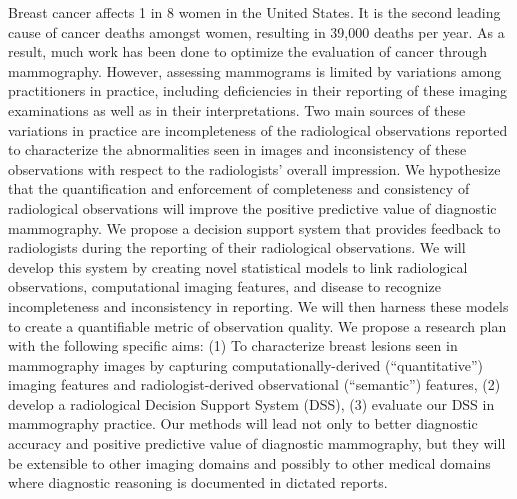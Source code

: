 Breast cancer affects 1 in 8 women in the United States. It is the second leading cause of cancer deaths amongst women, resulting in 39,000 deaths per year. As a result, much work has been done to optimize the evaluation of cancer through mammography. However, assessing mammograms is limited by variations among practitioners in practice, including deficiencies in their reporting of these imaging examinations as well as in their interpretations. Two main sources of these variations in practice are incompleteness of the radiological observations reported to characterize the abnormalities seen in images and inconsistency of these observations with respect to the radiologists' overall impression. We hypothesize that the quantification and enforcement of completeness and consistency of radiological observations will improve the positive predictive value of diagnostic mammography. We propose a decision support system that provides feedback to radiologists during the reporting of their radiological observations. We will develop this system by creating novel statistical models to link radiological observations, computational imaging features, and disease to recognize incompleteness and inconsistency in reporting. We will then harness these models to create a quantifiable metric of observation quality. We propose a research plan with the following specific aims: (1) To characterize breast lesions seen in mammography images by capturing computationally-derived (``quantitative'') imaging features and radiologist-derived observational (``semantic'') features, (2) develop a radiological Decision Support System (DSS), (3) evaluate our DSS in mammography practice. Our methods will lead not only to better diagnostic accuracy and positive predictive value of diagnostic mammography, but they will be extensible to other imaging domains and possibly to other medical domains where diagnostic reasoning is documented in dictated reports.

